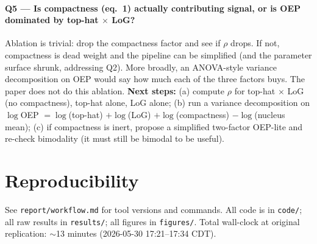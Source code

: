\documentclass[11pt]{article}
\begin{document}
\paragraph{Q5 --- Is compactness (eq.~1) actually contributing signal, or is OEP dominated by top-hat $\times$ LoG?} Ablation is trivial: drop the compactness factor and see if $\rho$ drops. If not, compactness is dead weight and the pipeline can be simplified (and the parameter surface shrunk, addressing Q2). More broadly, an ANOVA-style variance decomposition on OEP would say how much each of the three factors buys. The paper does not do this ablation. \textbf{Next steps:} (a) compute $\rho$ for top-hat $\times$ LoG (no compactness), top-hat alone, LoG alone; (b) run a variance decomposition on $\log$OEP $=\log$(top-hat) $+ \log$(LoG) $+ \log$(compactness) $- \log$(nucleus mean); (c) if compactness is inert, propose a simplified two-factor OEP-lite and re-check bimodality (it must still be bimodal to be useful).

\section{Reproducibility}
See \texttt{report/workflow.md} for tool versions and commands. All code is in \texttt{code/}; all raw results in \texttt{results/}; all figures in \texttt{figures/}. Total wall-clock at original replication: $\sim$13 minutes (2026-05-30 17:21--17:34 CDT).
\end{document}
